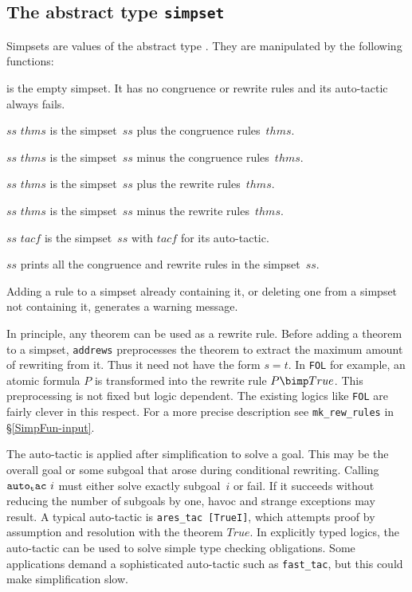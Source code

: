 \subsection{The abstract type {\tt simpset}}\label{simp-simpsets}
Simpsets are values of the abstract type .  They are
manipulated by the following functions:
\begin{ttdescription}
\item[\ttindexbold{empty_ss}] 
is the empty simpset.  It has no congruence or rewrite rules and its
auto-tactic always fails.

\item[$ss$ \ttindexbold{addcongs} $thms$] 
is the simpset~$ss$ plus the congruence rules~$thms$.

\item[$ss$ \ttindexbold{delcongs} $thms$] 
is the simpset~$ss$ minus the congruence rules~$thms$.

\item[$ss$ \ttindexbold{addrews} $thms$] 
is the simpset~$ss$ plus the rewrite rules~$thms$.

\item[$ss$ \ttindexbold{delrews} $thms$] 
is the simpset~$ss$ minus the rewrite rules~$thms$.

\item[$ss$ \ttindexbold{setauto} $tacf$] 
is the simpset~$ss$ with $tacf$ for its auto-tactic.

\item[\ttindexbold{print_ss} $ss$] 
prints all the congruence and rewrite rules in the simpset~$ss$.
\end{ttdescription}
Adding a rule to a simpset already containing it, or deleting one
from a simpset not containing it, generates a warning message.

In principle, any theorem can be used as a rewrite rule.  Before adding a
theorem to a simpset, {\tt addrews} preprocesses the theorem to extract the
maximum amount of rewriting from it.  Thus it need not have the form $s=t$.
In {\tt FOL} for example, an atomic formula $P$ is transformed into the
rewrite rule $P \bimp True$.  This preprocessing is not fixed but logic
dependent.  The existing logics like {\tt FOL} are fairly clever in this
respect.  For a more precise description see {\tt mk_rew_rules} in
\S\ref{SimpFun-input}.  

The auto-tactic is applied after simplification to solve a goal.  This may
be the overall goal or some subgoal that arose during conditional
rewriting.  Calling ${\tt auto_tac}~i$ must either solve exactly
subgoal~$i$ or fail.  If it succeeds without reducing the number of
subgoals by one, havoc and strange exceptions may result.
A typical auto-tactic is {\tt ares_tac [TrueI]}, which attempts proof by
assumption and resolution with the theorem $True$.  In explicitly typed
logics, the auto-tactic can be used to solve simple type checking
obligations.  Some applications demand a sophisticated auto-tactic such as
{\tt fast_tac}, but this could make simplification slow.
  
